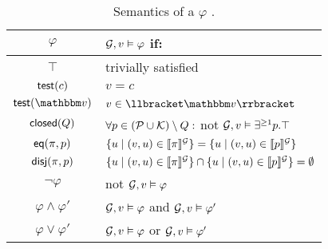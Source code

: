 \begin{table}[t]
  \caption{Semantics of a \shapeTerm $\varphi$ .}
  \label{tab:semphi2}
  \centering
  \begin{tabular}{cl}
    \toprule
    $\varphi$ & $\mathcal{G}, v \vDash \varphi$ if: \\
    \midrule

    $\top$ & trivially satisfied \\[2pt]
        $\mathsf{test}(c)$ & $v = c$\\[2pt]
    $\test(\vtype)$ & $v \in \sem{\vtype}$\\[2pt]

    $\mathsf{closed}(Q)$ &
                    $  \forall p \in (\mathcal{P}\cup\mathcal{K}) \setminus Q:$ not $\mathcal{G}, v \vDash \exists^{\geq 1} p. \top$
                 \\[2pt]

    



    $\mathsf{eq}(\pi,p)$ & $\{ u \mid (v,u) \in \llbracket \pi \rrbracket^{\mathcal{G}} \} = \{ u \mid (v,u) \in \llbracket p \rrbracket^{\mathcal{G}} \} $ \\[2pt]
    $\mathsf{disj}(\pi,p)$ & $\{ u \mid (v,u) \in \llbracket \pi \rrbracket^{\mathcal{G}} \} \cap \{ u \mid (v,u) \in \llbracket p \rrbracket^{\mathcal{G}} \} = \emptyset$\\[2pt]
    $\neg \varphi $ & not $\mathcal{G}, v \vDash \varphi$  \\[2pt]
    $\varphi \land \varphi' $ & $\mathcal{G}, v \vDash \varphi$ and $\mathcal{G}, v  \vDash \varphi'$  \\[2pt]
    $\varphi \lor \varphi' $  & $\mathcal{G}, v \vDash \varphi$ or $\mathcal{G}, v  \vDash \varphi'$\\[2pt]


\end{tabular}
\end{table}
